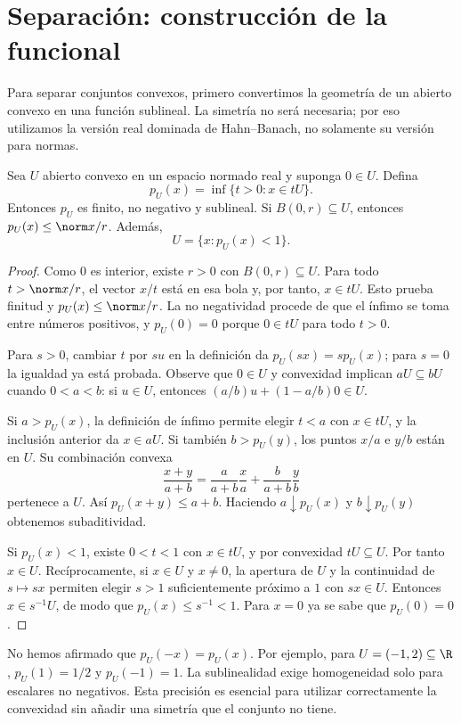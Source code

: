 \section{Separación: construcción de la funcional}

Para separar conjuntos convexos, primero convertimos la geometría de un abierto convexo en una función sublineal. La simetría no será necesaria; por eso utilizamos la versión real dominada de Hahn--Banach, no solamente su versión para normas.

\begin{lema}\label{ch24:minkowski}
Sea $U$ abierto convexo en un espacio normado real y suponga $0\in U$. Defina
\[
 p_U(x)=\inf\{t>0:x\in tU\}.
\]
Entonces $p_U$ es finito, no negativo y sublineal. Si $B(0,r)\subseteq U$, entonces $p_U(x)\leq\norm x/r$. Además,
\[U=\{x:p_U(x)<1\}.\]
\end{lema}
\begin{proof}
Como $0$ es interior, existe $r>0$ con $B(0,r)\subseteq U$. Para todo $t>\norm x/r$, el vector $x/t$ está en esa bola y, por tanto, $x\in tU$. Esto prueba finitud y $p_U(x)\leq\norm x/r$. La no negatividad procede de que el ínfimo se toma entre números positivos, y $p_U(0)=0$ porque $0\in tU$ para todo $t>0$.

Para $s>0$, cambiar $t$ por $su$ en la definición da $p_U(sx)=sp_U(x)$; para $s=0$ la igualdad ya está probada. Observe que $0\in U$ y convexidad implican $aU\subseteq bU$ cuando $0<a<b$: si $u\in U$, entonces $(a/b)u+(1-a/b)0\in U$.

Si $a>p_U(x)$, la definición de ínfimo permite elegir $t<a$ con $x\in tU$, y la inclusión anterior da $x\in aU$. Si también $b>p_U(y)$, los puntos $x/a$ e $y/b$ están en $U$. Su combinación convexa
\[
 \frac{x+y}{a+b}=\frac a{a+b}\frac xa+\frac b{a+b}\frac yb
\]
pertenece a $U$. Así $p_U(x+y)\leq a+b$. Haciendo $a\downarrow p_U(x)$ y $b\downarrow p_U(y)$ obtenemos subaditividad.

Si $p_U(x)<1$, existe $0<t<1$ con $x\in tU$, y por convexidad $tU\subseteq U$. Por tanto $x\in U$. Recíprocamente, si $x\in U$ y $x\ne0$, la apertura de $U$ y la continuidad de $s\mapsto sx$ permiten elegir $s>1$ suficientemente próximo a $1$ con $sx\in U$. Entonces $x\in s^{-1}U$, de modo que $p_U(x)\leq s^{-1}<1$. Para $x=0$ ya se sabe que $p_U(0)=0$.
\end{proof}

\begin{observacion}
No hemos afirmado que $p_U(-x)=p_U(x)$. Por ejemplo, para $U=(-1,2)\subseteq\R$, $p_U(1)=1/2$ y $p_U(-1)=1$. La sublinealidad exige homogeneidad solo para escalares no negativos. Esta precisión es esencial para utilizar correctamente la convexidad sin añadir una simetría que el conjunto no tiene.
\end{observacion}

